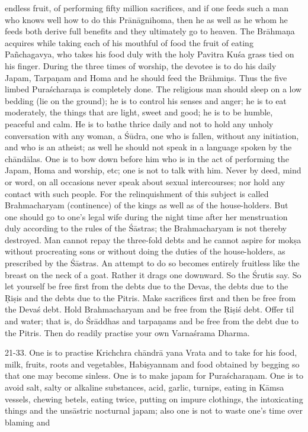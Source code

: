 endless fruit, of performing fifty million sacrifices, and if one feeds such a man who knows well how to do this Pr\=an\=agnihoma, then he as well as he whom he feeds both derive full benefits and they ultimately go to heaven. The Br\=ahma\d{n}a acquires while taking each of his mouthful of food the fruit of eating Pa\~nchagavya, who takes his food duly with the holy Pavitra Ku\'sa grass tied on his finger. During the three times of worship, the devotee is to do his daily Japam, Tarpa\d{n}am and Homa and he should feed the Br\=ahmi\d{n}s. Thus the five limbed Pura\'schara\d{n}a is completely done. The religious man should sleep on a low bedding (lie on the ground); he is to control his senses and anger; he is to eat moderately, the things that are light, sweet and good; he is to be humble, peaceful and calm. He is to bathe thrice daily and not to hold any unholy conversation with any woman, a \'S\=udra, one who is fallen, without any initiation, and who is an atheist; as well he should not speak in a language spoken by the ch\=and\=alas. One is to bow down before him who is in the act of performing the Japam, Homa and worship, etc; one is not to talk with him. Never by deed, mind or word, on all occasions never speak about sexual intercourses; nor hold any contact with such people. For the relinquishment of this subject is called Brahmacharyam (continence) of the kings as well as of the house-holders. But one should go to one's legal wife during the night time after her menstruation duly according to the rules of the \'S\=astras; the Brahmacharyam is not thereby destroyed. Man cannot repay the three-fold debts and he cannot aspire for mok\d{s}a without procreating sons or without doing the duties of the house-holders, as prescribed by the \'S\=astras. An attempt to do so becomes entirely fruitless like the breast on the neck of a goat. Rather it drags one downward. So the \'Srutis say. So let yourself be free first from the debts due to the Devas, the debts due to the \d{R}i\d{s}is and the debts due to the Pitris. Make sacrifices first and then be free from the Deva\'s debt. Hold Brahmacharyam and be free from the \d{R}i\d{s}i\'s debt. Offer til and water; that is, do \'Sr\=addhas and tarpa\d{n}ams and be free from the debt due to the Pitris. Then do readily practise your own Varna\'srama Dharma.

21-33. One is to practise Krichchra ch\=andr\=a yana Vrata and to take for his food, milk, fruits, roots and vegetables, Habi\d{s}yannam and food obtained by begging so that one may become sinless. One is to make japam for Pura\'schara\d{n}am. One is to avoid salt, salty or alkaline substances, acid, garlic, turnips, eating in K\=amsa vessels, chewing betels, eating twice, putting on impure clothings, the intoxicating things and the uns\=astric nocturnal japam; also one is not to waste one's time over blaming and


